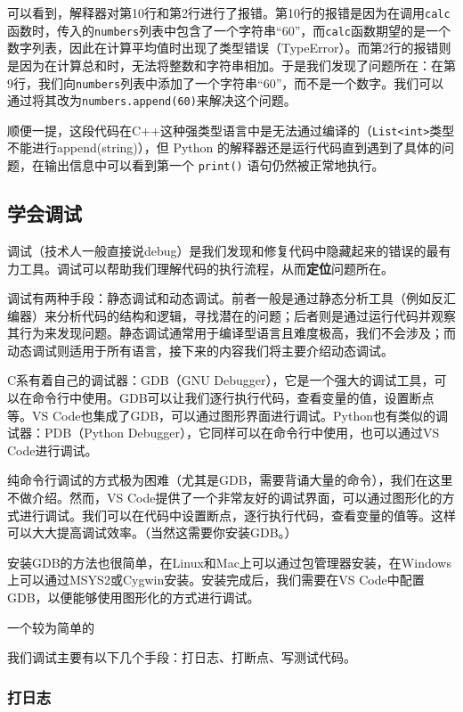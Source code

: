 \documentclass[../main.tex]{subfiles}
\begin{document}
可以看到，解释器对第10行和第2行进行了报错。第10行的报错是因为在调用\texttt{calc}函数时，传入的\texttt{numbers}列表中包含了一个字符串“60”，而\texttt{calc}函数期望的是一个数字列表，因此在计算平均值时出现了类型错误（TypeError）。而第2行的报错则是因为在计算总和时，无法将整数和字符串相加。于是我们发现了问题所在：在第9行，我们向\texttt{numbers}列表中添加了一个字符串“60”，而不是一个数字。我们可以通过将其改为\texttt{numbers.append(60)}来解决这个问题。

顺便一提，这段代码在C++这种强类型语言中是无法通过编译的（\texttt{List<int>}类型不能进行append(string)），但 Python 的解释器还是运行代码直到遇到了具体的问题，在输出信息中可以看到第一个 \texttt{print()} 语句仍然被正常地执行。

\subsection{学会调试}

调试（技术人一般直接说debug）是我们发现和修复代码中隐藏起来的错误的最有力工具。调试可以帮助我们理解代码的执行流程，从而\textbf{定位}问题所在。

调试有两种手段：静态调试和动态调试。前者一般是通过静态分析工具（例如反汇编器）来分析代码的结构和逻辑，寻找潜在的问题；后者则是通过运行代码并观察其行为来发现问题。静态调试通常用于编译型语言且难度极高，我们不会涉及；而动态调试则适用于所有语言，接下来的内容我们将主要介绍动态调试。

C系有着自己的调试器：GDB（GNU Debugger），它是一个强大的调试工具，可以在命令行中使用。GDB可以让我们逐行执行代码，查看变量的值，设置断点等。VS Code也集成了GDB，可以通过图形界面进行调试。Python也有类似的调试器：PDB（Python Debugger），它同样可以在命令行中使用，也可以通过VS Code进行调试。

纯命令行调试的方式极为困难（尤其是GDB，需要背诵大量的命令），我们在这里不做介绍。然而，VS Code提供了一个非常友好的调试界面，可以通过图形化的方式进行调试。我们可以在代码中设置断点，逐行执行代码，查看变量的值等。这样可以大大提高调试效率。（当然这需要你安装GDB。）

安装GDB的方法也很简单，在Linux和Mac上可以通过包管理器安装，在Windows上可以通过MSYS2或Cygwin安装。安装完成后，我们需要在VS Code中配置GDB，以便能够使用图形化的方式进行调试。

一个较为简单的

我们调试主要有以下几个手段：打日志、打断点、写测试代码。

\subsubsection{打日志}
\end{document}
